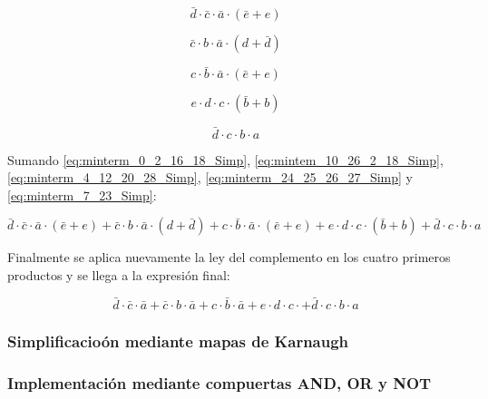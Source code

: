 \begin{equation}\label{eq:minterm_0_2_16_18_Simp}
\bar{d} \cdot \bar{c} \cdot \bar{a} \cdot (\bar{e} + e)
\end{equation}

\begin{equation}\label{eq:mintem_10_26_2_18_Simp}
\bar{c} \cdot b \cdot \bar{a} \cdot (d + \bar{d})
\end{equation}

\begin{equation}\label{eq:minterm_4_12_20_28_Simp}
c \cdot \bar{b} \cdot \bar{a} \cdot (\bar{e} + e)
\end{equation}

\begin{equation}\label{eq:minterm_24_25_26_27_Simp}
e \cdot d \cdot c \cdot (\bar{b} + b)
\end{equation}

\begin{equation}\label{eq:minterm_7_23_Simp}
\bar{d} \cdot c \cdot b \cdot a 
\end{equation}

Sumando \ref{eq:minterm_0_2_16_18_Simp}, \ref{eq:mintem_10_26_2_18_Simp}, \ref{eq:minterm_4_12_20_28_Simp}, \ref{eq:minterm_24_25_26_27_Simp} y \ref{eq:minterm_7_23_Simp}:

\begin{equation}
\bar{d} \cdot \bar{c} \cdot \bar{a} \cdot (\bar{e} + e) + 
\bar{c} \cdot b \cdot \bar{a} \cdot (d + \bar{d}) + 
c \cdot \bar{b} \cdot \bar{a} \cdot (\bar{e} + e) + 
e \cdot d \cdot c \cdot (\bar{b} + b) +
\bar{d} \cdot c \cdot b \cdot a 
\end{equation}

Finalmente se aplica nuevamente la ley del complemento en los cuatro primeros productos y se llega a la expresión final:

\begin{equation}\label{canonica_minterm}
\boxed{\bar{d} \cdot \bar{c} \cdot \bar{a} + 
\bar{c} \cdot b \cdot \bar{a} + 
c \cdot \bar{b} \cdot \bar{a} + 
e \cdot d \cdot c \cdot + 
\bar{d} \cdot c \cdot b \cdot a}
\end{equation}


\subsubsection{Simplificacioón mediante mapas de Karnaugh}


\subsubsection{Implementación mediante compuertas AND, OR y NOT}

